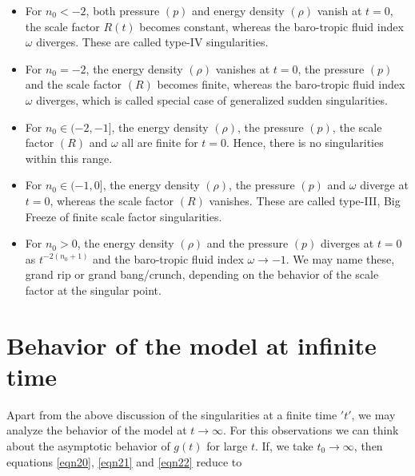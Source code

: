 \documentclass[11pt]{article}
\theoremstyle{theorem}
\theoremstyle{defi}
\begin{document}
\begin{itemize}
\item For $n_0<-2$, both pressure $(p)$ and energy density $(\rho)$ vanish at $t=0$, the scale factor $R(t)$ becomes constant, whereas the baro-tropic fluid index $\omega$ diverges.
These are called type-IV singularities.
\item For $n_0=-2$, the energy density $(\rho)$ vanishes at $t=0$, the pressure $(p)$ and the scale factor $(R)$ becomes finite, whereas the baro-tropic fluid index $\omega$ diverges, which is called special case of generalized sudden singularities. 

\item For $n_0\in (-2, -1]$, the energy density $(\rho)$, the pressure $(p)$, the scale factor $(R)$ and $\omega$ all are finite for $t=0$.
Hence, there is no singularities within this range.
\item For $n_0\in (-1, 0]$, the energy density $(\rho)$, the pressure $(p)$ and $\omega$ diverge at $t=0$, whereas the scale factor $(R)$ vanishes.
These are called type-III, Big Freeze of finite scale factor singularities.

\item For $n_0>0$, the energy density $(\rho)$ and the pressure $(p)$ diverges at $t=0$ as $t^{-2(n_0+1)}$ and the baro-tropic fluid index 
$\omega\rightarrow -1$. 
We may name these, grand rip or grand bang/crunch, depending on the behavior of
the scale factor at the singular point.
\end{itemize}
\section{Behavior of the model at infinite time}
Apart from the above discussion of the singularities at a finite time $'t'$, we may analyze the behavior of the model at $t \to\infty$. For this
observations we can think about the asymptotic behavior of $g(t)$ for large $t$. If, we take $t_0\to\infty$, then equations \eqref{eqn20}, \eqref{eqn21} and \eqref{eqn22} reduce to
\end{document}
